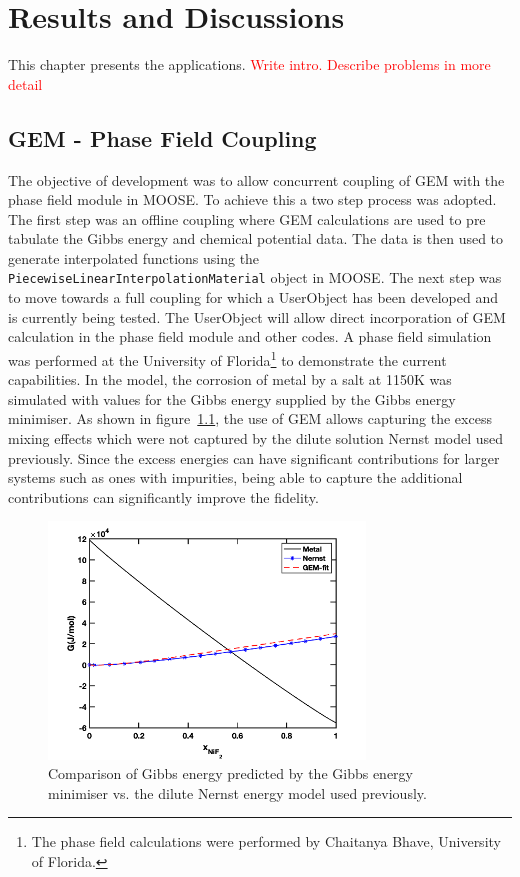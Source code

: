 \chapter{Results and Discussions} \label{chap:results}


	This chapter presents the applications. {\textcolor{red}{Write intro. Describe problems in more detail}}
	
	\section{GEM - Phase Field Coupling}
The objective of {\YJ} development was to allow concurrent coupling of GEM with the phase field module in MOOSE. To achieve this a two step process was adopted. The first step was an offline coupling where GEM calculations are used to pre tabulate the Gibbs energy and chemical potential data. The data is then used to generate interpolated functions using the \texttt{PiecewiseLinearInterpolationMaterial} object in MOOSE. The next step was to move towards a full coupling for which a UserObject has been developed and is currently being tested. The UserObject will allow direct incorporation of GEM calculation in the phase field module and other codes. A phase field simulation was performed at the University of Florida\footnote{The phase field calculations were performed by Chaitanya Bhave, University of Florida.} to demonstrate the current capabilities. In the model, the corrosion of  metal by a  salt at 1150\si{\kelvin} was simulated with values for the Gibbs energy supplied by the Gibbs energy minimiser. As shown in figure~\ref{fig:pfgibbs}, the use of GEM allows capturing the excess mixing effects which were not captured by the dilute solution Nernst model used previously. Since the excess energies can have significant contributions for larger systems such as ones with impurities, being able to capture the additional contributions can significantly improve the fidelity.
    \begin{figure}[h!]
        \centering
        \includegraphics[width=0.75\textwidth]{figures/chapter-7/gibbs.png}
        \caption{Comparison of Gibbs energy predicted by the Gibbs energy minimiser vs. the dilute Nernst energy model used previously.}
        \label{fig:pfgibbs}
    \end{figure}

